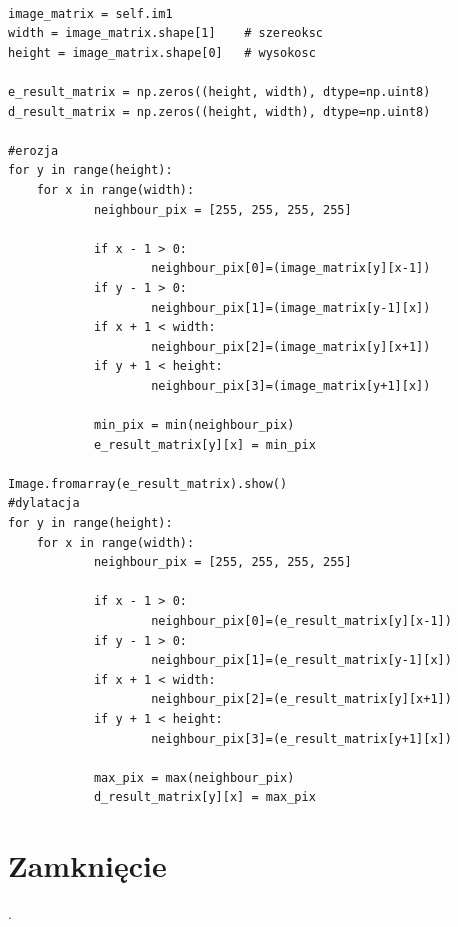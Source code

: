 \documentclass[final,a4paper,openany,12pt]{mwbk}
\begin{document}
\begin{lstlisting}[caption= Operacja otwarcia na obrazie szarym]

image_matrix = self.im1
width = image_matrix.shape[1]    # szereoksc
height = image_matrix.shape[0]   # wysokosc

e_result_matrix = np.zeros((height, width), dtype=np.uint8)
d_result_matrix = np.zeros((height, width), dtype=np.uint8)

#erozja
for y in range(height):
    for x in range(width):  
            neighbour_pix = [255, 255, 255, 255]

            if x - 1 > 0:
                    neighbour_pix[0]=(image_matrix[y][x-1])
            if y - 1 > 0:
                    neighbour_pix[1]=(image_matrix[y-1][x])
            if x + 1 < width:
                    neighbour_pix[2]=(image_matrix[y][x+1])
            if y + 1 < height:
                    neighbour_pix[3]=(image_matrix[y+1][x])

            min_pix = min(neighbour_pix)
            e_result_matrix[y][x] = min_pix

Image.fromarray(e_result_matrix).show()
#dylatacja
for y in range(height):
    for x in range(width):  
            neighbour_pix = [255, 255, 255, 255]

            if x - 1 > 0:
                    neighbour_pix[0]=(e_result_matrix[y][x-1])
            if y - 1 > 0:
                    neighbour_pix[1]=(e_result_matrix[y-1][x])
            if x + 1 < width:
                    neighbour_pix[2]=(e_result_matrix[y][x+1])
            if y + 1 < height:
                    neighbour_pix[3]=(e_result_matrix[y+1][x])

            max_pix = max(neighbour_pix)
            d_result_matrix[y][x] = max_pix    

\end{lstlisting}

\section{ Zamknięcie}
.
\hfill
\\\\
\indent
\end{document}
